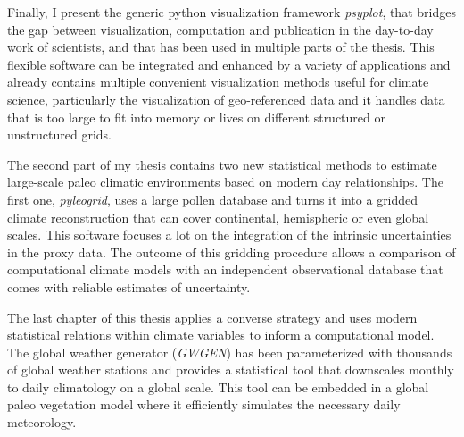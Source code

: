 \documentclass[
11pt, %
english, %
singlespacing, %
headsepline, %
]{MastersDoctoralThesis} %
\begin{document}
\begin{NoHyper}
\begin{thesisabstract}[]
Finally, I present the generic python visualization framework \textit{psyplot}, that bridges the gap between visualization, computation and publication in the day-to-day work of scientists, and that has been used in multiple parts of the thesis. This flexible software can be integrated and enhanced by a variety of applications and already contains multiple convenient visualization methods useful for climate science, particularly the visualization of geo-referenced data and it handles data that is too large to fit into memory or lives on different structured or unstructured grids.

The second part of my thesis contains two new statistical methods to estimate large-scale paleo climatic environments based on modern day relationships. The first one, \textit{pyleogrid}, uses a large pollen database and turns it into a gridded climate reconstruction that can cover continental, hemispheric or even global scales. This software focuses a lot on the integration of the intrinsic uncertainties in the proxy data. The outcome of this gridding procedure allows a comparison of computational climate models with an independent observational database that comes with reliable estimates of uncertainty.

The last chapter of this thesis applies a converse strategy and uses modern statistical relations within climate variables to inform a computational model. The global weather generator (\textit{GWGEN}) has been parameterized with thousands of global weather stations and provides a statistical tool that downscales monthly to daily climatology on a global scale. This tool can be embedded in a global paleo vegetation model where it efficiently simulates the necessary daily meteorology.
\end{thesisabstract}

\cleardoublepage

\let\Oldunivname\univname
\let\Olddeptname\deptname
\let\Oldfacname\facname
\let\Olddegreename\degreename


\end{NoHyper}
\end{document}
